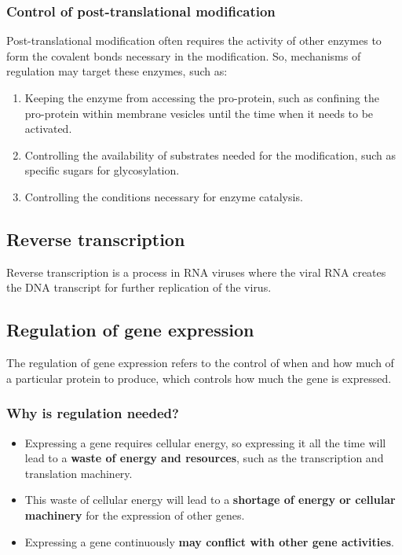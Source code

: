 \documentclass[11pt]{article}
\begin{document}
\subsubsection{Control of post-translational modification}
\label{sec:org477b3a7}
Post-translational modification often requires the activity of other enzymes to form the covalent bonds necessary in the modification. So, mechanisms of regulation may target these enzymes, such as:
\begin{enumerate}
\item Keeping the enzyme from accessing the pro-protein, such as confining the pro-protein within membrane vesicles until the time when it needs to be activated.
\item Controlling the availability of substrates needed for the modification, such as specific sugars for glycosylation.
\item Controlling the conditions necessary for enzyme catalysis.
\end{enumerate}

\subsection{Reverse transcription}
\label{sec:org89cb871}
Reverse transcription is a process in RNA viruses where the viral RNA creates the DNA transcript for further replication of the virus.

\newpage

\subsection{Regulation of gene expression}
\label{sec:org3a64ff2}
The regulation of gene expression refers to the control of when and how much of a particular protein to produce, which controls how much the gene is expressed.

\subsubsection{Why is regulation needed?}
\label{sec:orgc3543f7}
\begin{itemize}
\item Expressing a gene requires cellular energy, so expressing it all the time will lead to a \textbf{waste of energy and resources}, such as the transcription and translation machinery.
\item This waste of cellular energy will lead to a \textbf{shortage of energy or cellular machinery} for the expression of other genes.
\item Expressing a gene continuously \textbf{may conflict with other gene activities}.
\end{itemize}
\end{document}

